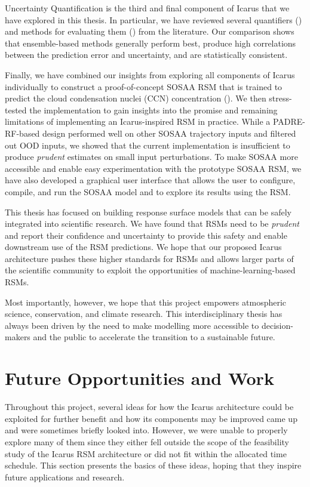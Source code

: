 Uncertainty Quantification is the third and final component of Icarus that we have explored in this thesis. In particular, we have reviewed several quantifiers () and methods for evaluating them () from the literature. Our comparison shows that ensemble-based methods generally perform best, produce high correlations between the prediction error and uncertainty, and are statistically consistent.

Finally, we have combined our insights from exploring all components of Icarus individually to construct a proof-of-concept SOSAA RSM that is trained to predict the cloud condensation nuclei (CCN) concentration (). We then stress-tested the implementation to gain insights into the promise and remaining limitations of implementing an Icarus-inspired RSM in practice. While a PADRE-RF-based design performed well on other SOSAA trajectory inputs and filtered out OOD inputs, we showed that the current implementation is insufficient to produce \textit{prudent} estimates on small input perturbations. To make SOSAA more accessible and enable easy experimentation with the prototype SOSAA RSM, we have also developed a graphical user interface that allows the user to configure, compile, and run the SOSAA model and to explore its results using the RSM.

\newpar This thesis has focused on building response surface models that can be safely integrated into scientific research. We have found that RSMs need to be \textit{prudent} and report their confidence and uncertainty to provide this safety and enable downstream use of the RSM predictions. We hope that our proposed Icarus architecture pushes these higher standards for RSMs and allows larger parts of the scientific community to exploit the opportunities of machine-learning-based RSMs.

Most importantly, however, we hope that this project empowers atmospheric science, conservation, and climate research. This interdisciplinary thesis has always been driven by the need to make modelling more accessible to decision-makers and the public to accelerate the transition to a sustainable future.

\section{Future Opportunities and Work}

Throughout this project, several ideas for how the Icarus architecture could be exploited for further benefit and how its components may be improved came up and were sometimes briefly looked into. However, we were unable to properly explore many of them since they either fell outside the scope of the feasibility study of the Icarus RSM architecture or did not fit within the allocated time schedule. This section presents the basics of these ideas, hoping that they inspire future applications and research.

